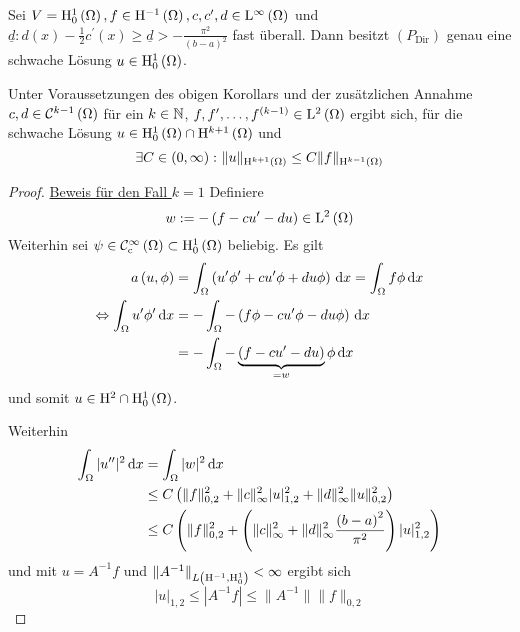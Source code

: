 \begin{lemma}[Korollar]
	Sei $V=\mathrm{H}^{1}_{0}\left(\Omega\right), f\in\mathrm{H}^{-1}\left(\Omega\right), c,c^{\prime},d\in\mathrm{L}^{\infty}\left(\Omega\right)$ und $\underline{d}\colon d\left(x\right)-\frac{1}{2}c^{\prime}\left(x\right) \geq \underline{d} > -\frac{\pi^{2}}{\left(b-a\right)^{2}}$ fast überall. Dann besitzt $\left(P_{\text{Dir}}\right)$ genau eine schwache Lösung $u\in\mathrm{H}^{1}_{0}\left(\Omega\right)$.
\end{lemma}

\begin{lemma}
	Unter Voraussetzungen des obigen Korollars und der zusätzlichen Annahme $c,d\in\mathcal{C}^{k-1}\left(\Omega\right)$ für ein $k\in\mathbb{N}$, $f,f^{\prime},\dots,f^{\left(k-1\right)}\in\mathrm{L}^{2}\left(\Omega\right)$ ergibt sich, für die schwache Lösung $u\in\mathrm{H}^{1}_{0}\left(\Omega\right)\cap\mathrm{H}^{k+1}\left(\Omega\right)$ und
	\begin{equation*}
		\exists C\in\left(0,\infty\right)\colon\|u\|_{\mathrm{H}^{k+1}\left(\Omega\right)}\leq C\|f\|_{\mathrm{H}^{k-1}\left(\Omega\right)}
	\end{equation*}
\end{lemma}
\begin{proof}
	\underline{Beweis für den Fall $k=1$}
	Definiere
	\begin{equation*}
		w:= -\left(f-cu^{\prime}-du\right)\in\mathrm{L}^{2}\left(\Omega\right)
	\end{equation*}
	Weiterhin sei $\psi\in\mathcal{C}^{\infty}_{\text{c}}\left(\Omega\right)\subset\mathrm{H}^{1}_{0}\left(\Omega\right)$ beliebig. Es gilt
	\begin{align*}
		a\left(u,\phi\right) &= \int_{\Omega}\left(u^{\prime}\phi^{\prime}+cu^{\prime}\phi + du\phi\right)\,\mathrm{d} x = \int_{\Omega}f\phi\,\mathrm{d} x\\
		\Leftrightarrow \int_{\Omega}u^{\prime}\phi^{\prime}\,\mathrm{d} x &= -\int_{\Omega}-\left(f\phi-cu^{\prime}\phi-du\phi\right)\,\mathrm{d} x\\
			&= -\int_{\Omega}-\underbrace{\left(f-cu^{\prime}-du\right)}_{=w}\phi\,\mathrm{d} x
	\end{align*}
	und somit $u\in\mathrm{H}^{2}\cap\mathrm{H}^{1}_{0}\left(\Omega\right)$.{}
	
	Weiterhin
	\begin{align*}
		\int_{\Omega}|u^{\prime\prime}|^{2}\,\mathrm{d} x &= \int_{\Omega}|w|^{2}\,\mathrm{d} x \\
			&\leq C\left(\|f\|_{0,2}^{2}+\|c\|_{\infty}^{2}|u|_{1,2}^{2}+\|d\|_{\infty}^{2}\|u\|_{0,2}^{2}\right)\\
			&\leq C\left(\|f\|_{0,2}^{2} + \left(\|c\|_{\infty}^{2}+\|d\|_{\infty}^{2}\frac{\left(b-a\right)^{2}}{\pi^{2}}\right)|u|_{1,2}^{2}\right)
	\end{align*}
	und mit $u=A^{-1}f$ und $\|A^{-1}\|_{L\left(\mathrm{H}^{-1},\mathrm{H}^{1}_{0}\right)} <\infty$ ergibt sich
	\begin{equation*}
		|u|_{1,2} \leq |A^{-1}f| \leq \|A^{-1}\|\|f\|_{0,2}
	\end{equation*}
\end{proof}

